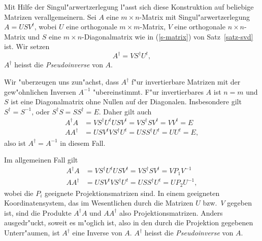 Mit Hilfe der Singul"arwertzerlegung l"asst sich diese Konstruktion
auf beliebige Matrizen verallgemeinern.
Sei $A$ eine $m\times n$-Matrix mit Singul"arwertzerlegung
$A=USV^t$, wobei $U$ eine orthogonale $m\times m$-Matrix, $V$ eine orthogonale
$n\times n$-Matrix und $S$ eine $m\times n$-Diagonalmatrix wie in (\ref{s-matrix})
von Satz~\ref{satz-svd} ist.
Wir setzen
\begin{equation}
A^\dagger = VS^\dagger U^t,
\label{definition-pseudoinverse}
\end{equation}
$A^\dagger$ heisst die {\em Pseudoinverse} von $A$.

Wir "uberzeugen uns zun"achst, dass $A^\dagger$ f"ur invertierbare Matrizen
mit der gew"ohnlichen Inversen $A^{-1}$ "ubereinstimmt.
F"ur invertierbares $A$ ist $n=m$ und $S$ ist eine Diagonalmatrix ohne Nullen
auf der Diagonalen.
Insbesondere gilt $S^\dagger=S^{-1}$, oder $S^\dagger S=SS^\dagger=E$.
Daher gilt auch
\begin{align*}
A^\dagger A&=VS^\dagger U^tUSV^t=VS^\dagger SV^t=VV^t=E\\
AA^\dagger &=USV^tVS^\dagger U^t=USS^\dagger U^t=UU^t=E,
\end{align*}
also ist $A^\dagger=A^{-1}$ in diesem Fall.

Im allgemeinen Fall gilt
\begin{align*}
A^\dagger A&=VS^\dagger U^tUSV^t=VS^\dagger SV^t=VP_1V^{-1}\\
AA^\dagger &=USV^tVS^\dagger U^t=USS^\dagger U^t=UP_2U^{-1},
\end{align*}
wobei die $P_i$ geeignete Projektionsmatrizen sind.
In einem geeigneten Koordinatensystem, das im Wesentlichen durch die Matrizen
$U$ bzw.~$V$ gegeben ist, sind die Produkte $A^\dagger A$ und $AA^\dagger$
also Projektionsmatrizen.
Anders ausgedr"uckt, soweit es m"oglich ist, also in den durch die Projektion
gegebenen Unterr"aumen, ist $A^\dagger$ eine Inverse von $A$.
$A^\dagger$ heisst die {\em Pseudoinverse} von $A$.

